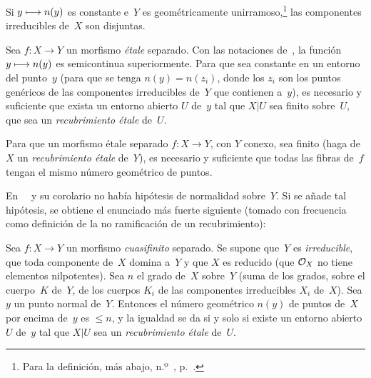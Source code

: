\begin{corollaire}
\label{I.10.8}
Si $y\mto n(y)$ es constante e~$Y$ es geométricamente unirramoso,\footnote{Para la definición, \cf más abajo, n.º~, p.~\pageref{I.11}.} las componentes irreducibles de~$X$ son disjuntas.
\end{corollaire}

\begin{proposition}
\label{I.10.9}
Sea $f\colon X\to Y$ un morfismo \emph{étale} separado. Con las notaciones de~, la función $y\mto n(y)$ es semicontinua superiormente. Para que sea constante en un entorno del punto~$y$ (\ie para que se tenga $n(y)=n(z_i)$, donde los $z_i$ son los puntos genéricos de las componentes irreducibles de~$Y$ que contienen a~$y$), es necesario y suficiente que exista un entorno abierto $U$ de~$y$ tal que $X|U$ sea finito sobre~$U$, \ie que sea un \emph{recubrimiento étale} de~$U$.
\end{proposition}

\begin{corollaire}
\label{I.10.10}
Para que un morfismo étale separado $f\colon X\to Y$, con $Y$ conexo, sea finito (\ie haga de~$X$ un \emph{recubrimiento étale} de~$Y$), es necesario y suficiente que todas las fibras de~$f$ tengan el mismo número geométrico de puntos.
\end{corollaire}

En~\ %
y su corolario no había hipótesis de normalidad sobre~$Y$. Si se añade tal hipótesis, se obtiene el enunciado más fuerte siguiente (tomado con frecuencia como definición de la no ramificación de un recubrimiento):

\begin{theoreme}
\label{I.10.11}
Sea
$f\colon X\to Y$ un morfismo \emph{cuasifinito} separado. Se supone que~$Y$ es \emph{irreducible}, que toda componente de~$X$ domina a~$Y$ y que $X$ es reducido (\ie que $\cal{O}_X$ no tiene elementos nilpotentes). Sea $n$ el grado de~$X$ sobre~$Y$ (suma de los grados, sobre el cuerpo~$K$ de~$Y$, de los cuerpos $K_i$ de las componentes irreducibles $X_i$ de~$X$). Sea $y$ un punto normal de~$Y$. Entonces el número geométrico $n(y)$ de puntos de~$X$ por encima de~$y$ es $\leq n$, y la igualdad se da si y solo si existe un entorno abierto $U$ de~$y$ tal que $X|U$ sea un \emph{recubrimiento étale} de~$U$.
\end{theoreme}

